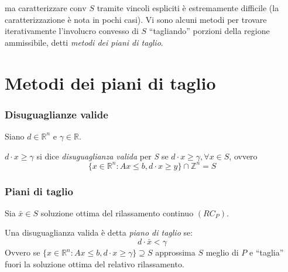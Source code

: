 \documentclass[a4paper,11pt]{book}
\newcommand{\reals}{\mathbb{R}}
\newcommand{\integers}{\mathbb{Z}}
\theoremstyle{break}
\begin{document}
ma caratterizzare $\text{conv }S$ tramite vincoli espliciti è estremamente difficile (la caratterizzazione è nota in pochi casi). Vi sono alcuni metodi per trovare iterativamente l'involucro convesso di $S$ ``tagliando'' porzioni della regione ammissibile, detti \emph{metodi dei piani di taglio}.
\newpage
\section{Metodi dei piani di taglio}
\subsubsection*{Disuguaglianze valide}
Siano $d \in \reals^n$ e $\gamma \in \reals$.

$d\cdot x \geq \gamma$ si dice \emph{disuguaglianza valida} per \emph{S} se $d \cdot x \geq \gamma, \forall x \in S$, ovvero
\[\{x \in \reals^n : Ax \leq b, d\cdot x \geq y\} \cap \integers^n = S\]

\subsubsection*{Piani di taglio}
Sia $\bar x \in S$ soluzione ottima del rilassamento continuo $(RC_P)$.

Una disuguaglianza valida è detta \emph{piano di taglio} se: \[d \cdot \bar x < \gamma\]
Ovvero se $\{x \in \reals^n : Ax \leq b, d\cdot x \geq \gamma\} \supseteq S$ approssima $S$ meglio di $P$ e ``taglia'' fuori la soluzione ottima del relativo rilassamento. 
\end{document}
